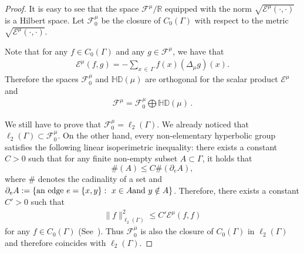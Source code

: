\documentclass[10pt]{amsart}
\theoremstyle{definition}\newtheorem{defi}[theo]{Definition}\newtheorem{rema}[theo]{Remark}\newtheorem{exam}[theo]{Example}\newtheorem{exem}[theo]{Example}\newtheorem{nota}[theo]{Notation}
\newcommand{\ce}{\mathcal{E}}
\newcommand{\cf}{\mathcal{F}}
\newcommand{\br}{\mathbb{R}}
\newcommand{\bHD}{\mathbb{HD}}
\begin{document}
\begin{proof}
It is easy to see that the space $\cf^{\mu}/\br$ equipped with the norm $\sqrt{\ce^{\mu}(\cdot,\cdot)}$ is a Hilbert space. Let $\cf^{\mu}_0$ be the closure of $C_0(\Gamma)$ with respect to the metric $\sqrt{\ce^{\mu}(\cdot,\cdot)}$.

Note that for any $f\in C_0(\Gamma) $ and any $g\in \cf^{\mu}$, we have that
\begin{align}\label{int-part}
\ce^{\mu}(f,g)=-\sum_{x\,\in\,\Gamma}f(x)(\Delta_{\mu}g)(x).
\end{align}
Therefore the spaces $\cf^{\mu}_0$ and $\bHD(\mu)$ are orthogonal for the scalar product $\ce^\mu$ and
\begin{align*}
\cf^{\mu}=\cf^{\mu}_0\bigoplus \bHD(\mu)\,.
\end{align*}

We still have to prove that $\cf^{\mu}_0=\ell_2(\Gamma)$. We already noticed that $\ell_2(\Gamma)\subset\cf^{\mu}_0$. On the other hand, every non-elementary hyperbolic group satisfies the following linear isoperimetric inequality: there exists a constant $C>0$ such that for any finite non-empty subset $A\subset\Gamma$, it holds that
\[
\#(A)\leq C\#(\partial_eA),
\]
where $\#$ denotes the cadinality of a set and $\partial_eA:=\{\text{an edge}\ e=\{x,y\}:\ x\in A\linebreak\text{and}\ y\notin A\}$. Therefore, there exists a constant $C'>0$ such that
\begin{align}\label{P}
\|f\|_{\ell_2(\Gamma)}^2\leq C'\ce^{\mu}(f,f)
\end{align}
for any $f\in C_0(\Gamma)$ (See~\cite[Theorem~4.27]{Soa}). Thus $\cf^{\mu}_0$ is also the closure of $C_0(\Gamma)$ in $\ell_2(\Gamma)$ and therefore coincides with $\ell_2(\Gamma)$.
\end{proof}
\end{document}

